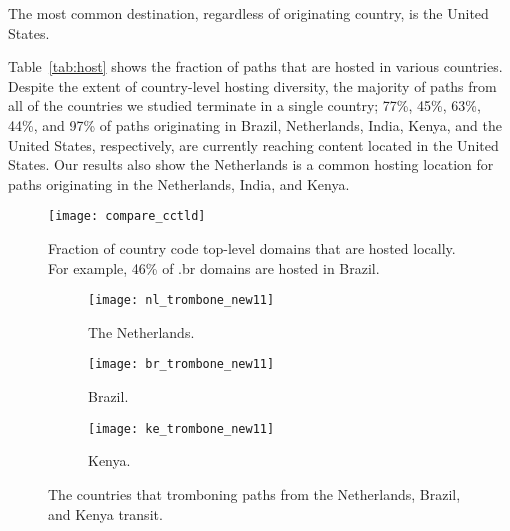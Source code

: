 

\begin{finding}
The most common destination, regardless of originating country, is the United States.
\end{finding}
\noindent
Table~\ref{tab:host} shows the fraction of paths that are hosted in various
countries.  Despite the extent of country-level hosting diversity, the
majority of paths from all of the countries we studied terminate in a single
country; 77\%, 45\%, 63\%, 44\%, and 97\% of paths originating in Brazil, Netherlands, India,
Kenya, and the United States, respectively, are currently reaching content located in the
United States.   Our results also
show the Netherlands is a common hosting location for paths originating in the
Netherlands, India, and Kenya.

\begin{figure}[t]
\centering
\texttt{[image: compare\_cctld]}
\caption{Fraction of country code top-level domains that are hosted locally. For example, 46\% of .br domains are hosted in Brazil.}
\label{fig:cctld_graph}
\end{figure}

\begin{figure*}[t!]
\centering
\begin{minipage}{\linewidth}
\begin{subfigure}[b]{.3\linewidth}
\texttt{[image: nl\_trombone\_new11]}
\caption{The Netherlands.\label{fig:trombone_netherlands}}
\end{subfigure}
\begin{subfigure}[b]{.3\linewidth}
\texttt{[image: br\_trombone\_new11]}
\caption{Brazil.\label{fig:trombone_brazil}}
\end{subfigure}
\begin{subfigure}[b]{.3\linewidth}
\texttt{[image: ke\_trombone\_new11]}
\caption{Kenya.\label{fig:trombone_kenya}}
\end{subfigure}
\end{minipage}
\caption{The countries that tromboning paths from the Netherlands, Brazil, and Kenya transit.}
\label{fig:trombone}
\end{figure*}


